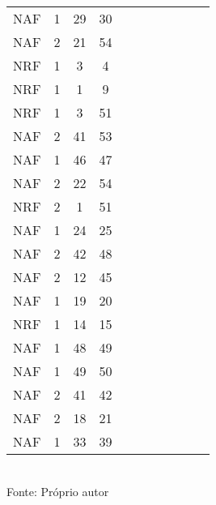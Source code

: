 \begin{table}[H]
{\begin{tabular}{ccccccccccc}
NAF & 1 & 29 & 30 &  &  &  &  &  &  &  \\
NAF & 2 & 21 & 54 &  &  &  &  &  &  &  \\
NRF & 1 & 3 & 4 &  &  &  &  &  &  &  \\
NRF & 1 & 1 & 9 &  &  &  &  &  &  &  \\
NRF & 1 & 3 & 51 &  &  &  &  &  &  &  \\
NAF & 2 & 41 & 53 &  &  &  &  &  &  &  \\
NAF & 1 & 46 & 47 &  &  &  &  &  &  &  \\
NAF & 2 & 22 & 54 &  &  &  &  &  &  &  \\
NRF & 2 & 1 & 51 &  &  &  &  &  &  &  \\
NAF & 1 & 24 & 25 &  &  &  &  &  &  &  \\
NAF & 2 & 42 & 48 &  &  &  &  &  &  &  \\
NAF & 2 & 12 & 45 &  &  &  &  &  &  &  \\
NAF & 1 & 19 & 20 &  &  &  &  &  &  &  \\
NRF & 1 & 14 & 15 &  &  &  &  &  &  &  \\
NAF & 1 & 48 & 49 &  &  &  &  &  &  &  \\
NAF & 1 & 49 & 50 &  &  &  &  &  &  &  \\
NAF & 2 & 41 & 42 &  &  &  &  &  &  &  \\
NAF & 2 & 18 & 21 &  &  &  &  &  &  &  \\
NAF & 1 & 33 & 39 &  &  &  &  &  &  &  \\
\bottomrule
\end{tabular}}
\\Fonte: Próprio autor
\end{table}


